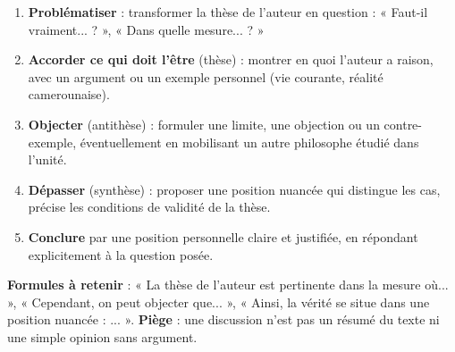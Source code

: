 \documentclass[11pt]{article}
\begin{document}
\begin{methode}
\begin{enumerate}
\item \textbf{Problématiser} : transformer la thèse de l'auteur en question : « Faut-il vraiment... ? », « Dans quelle mesure... ? »
\item \textbf{Accorder ce qui doit l'être} (thèse) : montrer en quoi l'auteur a raison, avec un argument ou un exemple personnel (vie courante, réalité camerounaise).
\item \textbf{Objecter} (antithèse) : formuler une limite, une objection ou un contre-exemple, éventuellement en mobilisant un autre philosophe étudié dans l'unité.
\item \textbf{Dépasser} (synthèse) : proposer une position nuancée qui distingue les cas, précise les conditions de validité de la thèse.
\item \textbf{Conclure} par une position personnelle claire et justifiée, en répondant explicitement à la question posée.
\end{enumerate}
\textbf{Formules à retenir} : « La thèse de l'auteur est pertinente dans la mesure où... », « Cependant, on peut objecter que... », « Ainsi, la vérité se situe dans une position nuancée : ... ». \textbf{Piège} : une discussion n'est pas un résumé du texte ni une simple opinion sans argument.
\end{methode}
\end{document}

